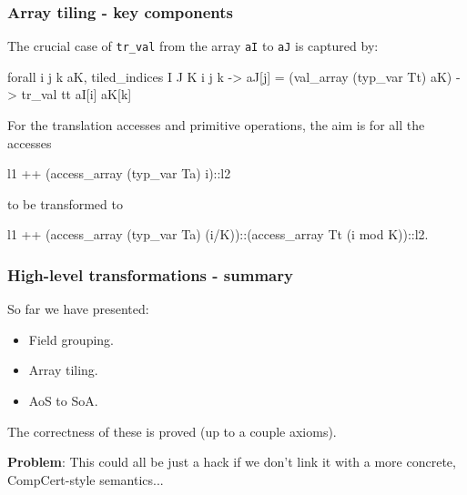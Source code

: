 \begin{frame}[fragile]
\frametitle{Array tiling - key components}



The crucial case of \texttt{tr\_val} from the array \texttt{aI} to \texttt{aJ} is captured by: 

\begin{coqs}
  forall i j k aK,		tiled_indices I J K i j k ->
				  aJ[j] = (val_array (typ_var Tt) aK) ->
				  tr_val tt aI[i] aK[k]
\end{coqs}

\bigskip

For the translation accesses and primitive operations, the aim is for all the accesses

\begin{coqs}
  l1 ++ (access_array (typ_var Ta) i)::l2
\end{coqs}

to be transformed to

\begin{coqs}
  l1 ++ (access_array (typ_var Ta) (i/K))::(access_array Tt (i mod K))::l2.
\end{coqs}

\end{frame}



\begin{frame}[fragile]
\frametitle{High-level transformations - summary}

So far we have presented:

\begin{itemize}
	\setlength\itemsep{1.5em}
	\item Field grouping.
	\item Array tiling.
	\item AoS to SoA.
\end{itemize}

\bigskip

The correctness of these is proved (up to a couple axioms). 

\bigskip

\textbf{Problem}: This could all be just a hack if we don't link it with a more concrete, CompCert-style semantics...

\end{frame}


